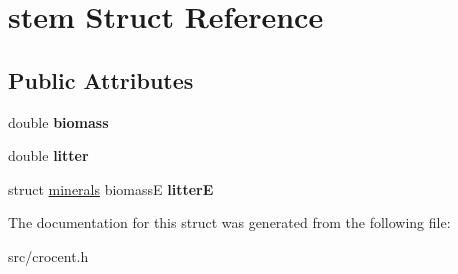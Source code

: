 \hypertarget{structstem}{\section{stem Struct Reference}
\label{structstem}
}
\subsection*{Public Attributes}
\begin{DoxyCompactItemize}
\item 
\hypertarget{structstem_a126e15861c707cfe4343ca64510da673}{double {\bfseries biomass}}\label{structstem_a126e15861c707cfe4343ca64510da673}

\item 
\hypertarget{structstem_a8d9fef0483c75cdc4e6b6779f4b3b1ec}{double {\bfseries litter}}\label{structstem_a8d9fef0483c75cdc4e6b6779f4b3b1ec}

\item 
\hypertarget{structstem_ac1d87a138eefc5aa8f5c430c4bfb471c}{struct \hyperlink{structminerals}{minerals} biomass\-E {\bfseries litter\-E}}\label{structstem_ac1d87a138eefc5aa8f5c430c4bfb471c}

\end{DoxyCompactItemize}


The documentation for this struct was generated from the following file\-:\begin{DoxyCompactItemize}
\item 
src/crocent.\-h\end{DoxyCompactItemize}
